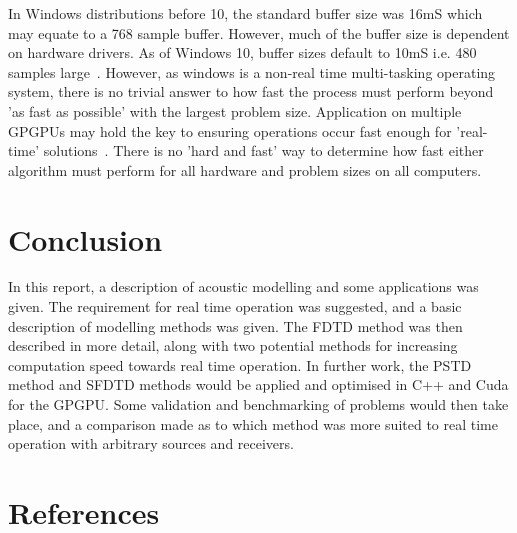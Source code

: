 \documentclass{svproc}
\begin{document}
In Windows distributions before 10, the standard buffer size was 16mS which may equate to a 768 sample buffer. However, much of the buffer size is dependent on hardware drivers. As of Windows 10, buffer sizes default to 10mS i.e. 480 samples large~\cite{Microsoft2016}. However, as windows is a non-real time multi-tasking operating system, there is no trivial answer to how fast the process must perform beyond 'as fast as possible' with the largest problem size. Application on multiple GPGPUs may hold the key to ensuring operations occur fast enough for 'real-time' solutions~\cite{Savioja2010}. There is no 'hard and fast' way to determine how fast either algorithm must perform for all hardware and problem sizes on all computers.

\section{Conclusion}
In this report, a description of acoustic modelling and some applications was given. The requirement for real time operation was suggested, and a basic description of modelling methods was given. The FDTD method was then described in more detail, along with two potential methods for increasing computation speed towards real time operation. In further work, the PSTD method and SFDTD methods would be applied and optimised in C++ and Cuda for the GPGPU. Some validation and benchmarking of problems would then take place, and a comparison made as to which method was more suited to real time operation with arbitrary sources and receivers.




\section{References}


\end{document}
